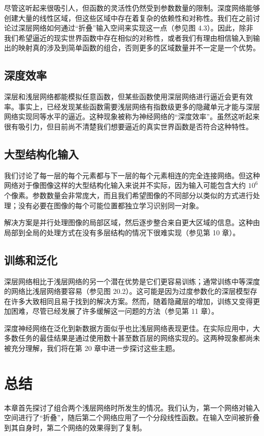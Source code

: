 \documentclass[lang=cn,newtx,10pt,scheme=chinese]{elegantbook}
\begin{document}
尽管这听起来很吸引人，但函数的灵活性仍然受到参数数量的限制。深度网络能够创建大量的线性区域，但这些区域中存在着复杂的依赖性和对称性。我们在之前讨论过深层网络如何通过“折叠”输入空间来实现这一点（参见图 4.3）。因此，除非我们希望逼近的现实世界函数中存在相似的对称性，或者我们有理由相信输入到输出的映射真的涉及到简单函数的组合，否则更多的区域数量并不一定是一个优势。

\subsection{深度效率}
深层和浅层网络都能模拟任意函数，但某些函数使用深层网络进行逼近会更有效率。事实上，已经发现某些函数需要浅层网络有指数级更多的隐藏单元才能与深层网络实现同等水平的逼近。这种现象被称为神经网络的“深度效率”。虽然这听起来很有吸引力，但目前尚不清楚我们想要逼近的真实世界函数是否符合这种特性。

\subsection{大型结构化输入}
我们讨论了每一层的每个元素都与下一层的每个元素相连的完全连接网络。但这种网络对于像图像这样的大型结构化输入来说并不实际，因为输入可能包含大约 $10^6$ 个像素。参数数量会非常庞大，而且我们希望图像的不同部分以类似的方式进行处理；没有必要在图像的每个可能位置都独立学习识别同一对象。

解决方案是并行处理图像的局部区域，然后逐步整合来自更大区域的信息。这种由局部到全局的处理方式在没有多层结构的情况下很难实现（参见第 10 章）。

\subsection{训练和泛化}
深层网络相比于浅层网络的另一个潜在优势是它们更容易训练；通常训练中等深度的网络比浅层网络要容易（参见图 20.2）。这可能是因为过度参数化的深层模型存在许多大致相同且易于找到的解决方案。然而，随着隐藏层的增加，训练又变得更加困难，尽管已经发展了许多缓解这一问题的方法（参见第 11 章）。

深度神经网络在泛化到新数据方面似乎也比浅层网络表现更佳。在实际应用中，大多数任务的最佳结果是通过使用数十甚至数百层的网络实现的。这两种现象都尚未被充分理解，我们将在第 20 章中进一步探讨这些主题。
\section{总结}
本章首先探讨了组合两个浅层网络时所发生的情况。我们认为，第一个网络对输入空间进行了“折叠”，随后第二个网络应用了一个分段线性函数。在输入空间被折叠到其自身时，第二个网络的效果得到了复制。
\end{document}
